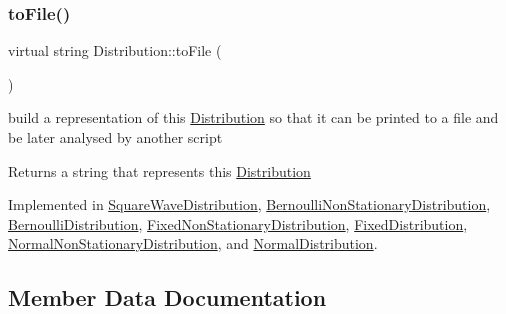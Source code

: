 \mbox{\label{class_distribution_ac41d57a4d7f82041810f886590a236a5}} 
\subsubsection{\texorpdfstring{to\+File()}{toFile()}}
{\footnotesize\ttfamily virtual string Distribution\+::to\+File (\begin{DoxyParamCaption}{ }\end{DoxyParamCaption})\hspace{0.3cm}{\ttfamily [pure virtual]}}



build a representation of this \mbox{\hyperlink{class_distribution}{Distribution}} so that it can be printed to a file and be later analysed by another script 

\begin{DoxyReturn}{Returns}
a string that represents this \mbox{\hyperlink{class_distribution}{Distribution}} 
\end{DoxyReturn}


Implemented in \mbox{\hyperlink{class_square_wave_distribution_a8ba3fbbf02f23f02697f34f841e9a870}{Square\+Wave\+Distribution}}, \mbox{\hyperlink{class_bernoulli_non_stationary_distribution_a5db3f4675ff988f3c775a939f8ef4847}{Bernoulli\+Non\+Stationary\+Distribution}}, \mbox{\hyperlink{class_bernoulli_distribution_a29f9f1014234828255def7bf9872b086}{Bernoulli\+Distribution}}, \mbox{\hyperlink{class_fixed_non_stationary_distribution_aaea49214758451b31f83a272af1626e0}{Fixed\+Non\+Stationary\+Distribution}}, \mbox{\hyperlink{class_fixed_distribution_a6396ce831e3ff31ecc39bda45e3ecb08}{Fixed\+Distribution}}, \mbox{\hyperlink{class_normal_non_stationary_distribution_a4f2f7cdfacf8b54a0cb2b5237213a693}{Normal\+Non\+Stationary\+Distribution}}, and \mbox{\hyperlink{class_normal_distribution_aba8376a8b209a82d8d042c9d2a4c412c}{Normal\+Distribution}}.



\subsection{Member Data Documentation}
\mbox{\label{class_distribution_a58fa80cadc13b26e12e9ed34aa8b926c}} 
